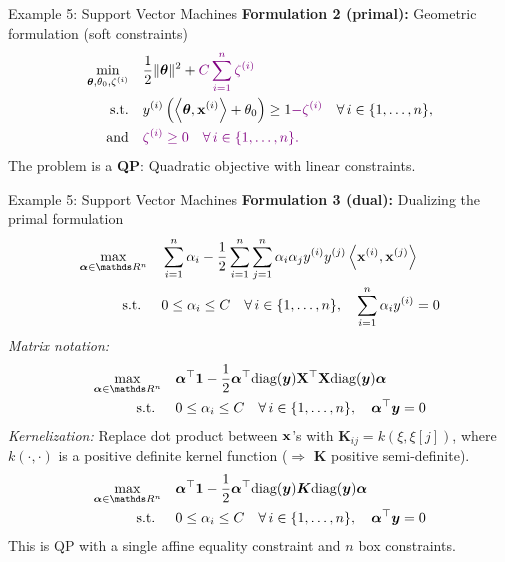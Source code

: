 \documentclass[11pt,compress,t,notes=noshow, xcolor=table]{beamer}
\begin{document}
\begin{frame2}{Example 5: Support Vector Machines}
\textbf{Formulation 2 (primal): } Geometric formulation (soft constraints)
$$
\begin{aligned}
\min\limits_{\bm{\theta}, \theta_0, \zeta^{(i)}} \quad & \frac{1}{2} \|\bm{\theta}\|^2 + \textcolor{violet}{C   \sum_{i=1}^n \zeta^{(i)}} \\
\text{s.t.} \quad & y^{(i)}  \left( \left\langle \bm{\theta}, \mathbf{x}^{(i)} \right\rangle + \theta_0 \right) \ge 1 \textcolor{violet}{- \zeta^{(i)}} \quad \forall\, i \in \{1, \ldots, n\}, \\
\text{and} \quad & \textcolor{violet}{\zeta^{(i)} \ge 0 \quad \forall\, i \in \{1, \ldots, n\}.}
\end{aligned}
$$
\spacer
The problem is a \textbf{QP}: Quadratic objective with linear constraints.
\end{frame2}


\begin{frame2}[footnotesize]{Example 5: Support Vector Machines}
\textbf{Formulation 3 (dual): } Dualizing the primal formulation
$$
\begin{aligned}
\max\limits_{\bm{\alpha} \in \R^n} \quad & \sum_{i=1}^n \alpha_i - \frac{1}{2}\sum_{i=1}^n\sum_{j=1}^n\alpha_i\alpha_j\yi y^{(j)} \scp{\xi}{\xv^{(j)}} \\
\text{s.t. } \quad & 0 \le \alpha_i \le C \quad \forall\, i \in \nset, \quad \sum_{i=1}^n \alpha_i \yi = 0
\end{aligned}
$$
\spacer
\textit{Matrix notation:}
$$
\begin{aligned}
\max\limits_{\bm{\alpha} \in \R^n} \quad & \bm{\alpha}^\top \bm{1} - \frac{1}{2} \bm{\alpha}^\top \text{diag}(\bm{y}) \Xmat^\top \Xmat \text{diag}(\bm{y})\bm{\alpha} \\
\text{s.t. } \quad & 0 \le \alpha_i \le C \quad \forall\, i \in \nset, \quad \bm{\alpha}^\top \bm{y} = 0
\end{aligned}
$$
\textit{Kernelization:}
Replace dot product between $\mathbf{x}$'s with $\bm{K}_{ij} = k(\xi, \xi[j])$, where $k(\cdot,\cdot)$ is a positive definite kernel function ($\Rightarrow$ $\bm{K}$ positive semi-definite).
\spacer
$$
\begin{aligned}
\max\limits_{\bm{\alpha} \in \R^n} \quad & \bm{\alpha}^\top \bm{1} - \frac{1}{2} \bm{\alpha}^\top \text{diag}(\bm{y}) \bm{K} \text{diag}(\bm{y})\bm{\alpha} \\
\text{s.t. } \quad & 0 \le \alpha_i \le C \quad \forall\, i \in \nset, \quad \bm{\alpha}^\top \bm{y} = 0
\end{aligned}
$$
\spacer
This is QP with a single affine equality constraint and $n$ box constraints.
\end{frame2}
\end{document}
